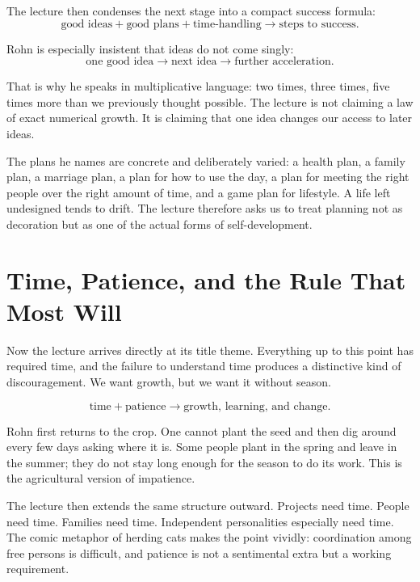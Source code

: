 The lecture then condenses the next stage into a compact success formula:
\begin{equation}
\text{good ideas} + \text{good plans} + \text{time-handling} \rightarrow \text{steps to success}.
\end{equation}

Rohn is especially insistent that ideas do not come singly:
\begin{equation}
\text{one good idea} \rightarrow \text{next idea} \rightarrow \text{further acceleration}.
\end{equation}

That is why he speaks in multiplicative language: two times, three times, five times more than we previously thought possible. The lecture is not claiming a law of exact numerical growth. It is claiming that one idea changes our access to later ideas.

The plans he names are concrete and deliberately varied: a health plan, a family plan, a marriage plan, a plan for how to use the day, a plan for meeting the right people over the right amount of time, and a game plan for lifestyle. A life left undesigned tends to drift. The lecture therefore asks us to treat planning not as decoration but as one of the actual forms of self-development.

\section{Time, Patience, and the Rule That Most Will}

Now the lecture arrives directly at its title theme. Everything up to this point has required time, and the failure to understand time produces a distinctive kind of discouragement. We want growth, but we want it without season.

\begin{equation}
\text{time} + \text{patience} \rightarrow \text{growth, learning, and change}.
\end{equation}

Rohn first returns to the crop. One cannot plant the seed and then dig around every few days asking where it is. Some people plant in the spring and leave in the summer; they do not stay long enough for the season to do its work. This is the agricultural version of impatience.

The lecture then extends the same structure outward. Projects need time. People need time. Families need time. Independent personalities especially need time. The comic metaphor of herding cats makes the point vividly: coordination among free persons is difficult, and patience is not a sentimental extra but a working requirement.


